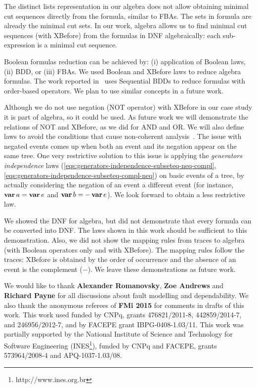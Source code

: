 \documentclass[en,twoside,onehalfspacing,phd]{risethesis}
\def\varop{\ensuremath\operatorname{\mathbf{var}}}
\newcommand{\var}[1]{\ensuremath\varop #1}
\begin{document}
The distinct lists representation in our algebra does not allow obtaining minimal cut sequences directly from the formula, similar to \acp{FBA}.
The sets in  formula are already the minimal cut sets.
In our work, \ac{algebra} allows us to find minimal cut sequences (with XBefore) from the formulas in DNF algebraically: each sub-expression is a minimal cut sequence.

Boolean formulas reduction can be achieved by: (i) application of Boolean laws, (ii) \ac{BDD}, or (iii) \acp{FBA}.
We used Boolean and XBefore laws to reduce \ac{algebra} formulas.
%
The work reported in~\cite{TXD2011,XTD2012} uses Sequential BDDs to reduce formulas with order-based operators.
%
We plan to use similar concepts in a future work.

Although we do not use negation (NOT operator) with XBefore in our case study it is part of \ac{algebra}, so it could be used.
As future work we will demonstrate the relations of NOT and XBefore, as we did for AND and OR.
We will also define laws to avoid the conditions that cause non-coherent analysis~\cite{Oliv2006}.
The issue with negated events comes up when both an event and its negation appear on the same tree.
One very restrictive solution to this issue is applying the \emph{generators independence} laws (\ref{eqs:generators-independence-subseteq-neq-compl}, \ref{eqs:generators-independence-subseteq-compl-neq}) on basic events of a tree, by actually considering the negation of an event a different event (for instance, $\var a= \var e$ and $\var b=-\var e$).
We look forward to obtain a less restrictive law.


We showed the DNF for \ac{algebra}, but did not demonstrate that every formula can be converted into DNF.
The laws shown in this work should be sufficient to this demonstration.
Also, we did not show the mapping rules from traces to \ac{algebra} (with Boolean operators only and with XBefore).
The mapping rules follow the traces: XBefore is obtained by the order of occurrence and the absence of an event is the complement ($-$).
We leave these demonstrations as future work.


\begin{sloppypar}
\begin{acknowledgements}
We would like to thank \textbf{Alexander Romanovsky}, \textbf{Zoe Andrews} and \textbf{Richard Payne} for all discussions about fault modelling and dependability.
%
We also thank the anonymous referees of \textbf{FMi 2015}
for comments in drafts of this work.
%
This work used funded by CNPq, grants 476821/2011-8, 442859/2014-7, and 246956/2012-7, and
%
by FACEPE grant IBPG-0408-1.03/11. 
%
This work was partially supported by the National Institute of Science and Technology for Software Engineering (INES\footnote{http://www.ines.org.br}), funded by CNPq and FACEPE, grants 573964/2008-4 and APQ-1037-1.03/08.
\end{acknowledgements}
\end{sloppypar}
\end{document}
